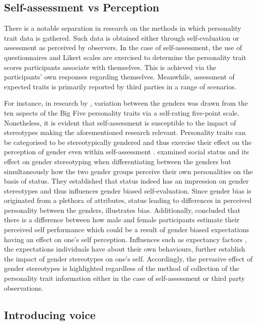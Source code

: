 \documentclass{l4proj}
\begin{document}
\subsection{Self-assessment vs Perception}\label{sec:self_vs_perception}
There is a notable separation in research on the methods in which personality trait data is gathered. Such data is obtained either through self-evaluation or assessment as perceived by observers. In the case of self-assessment, the use of questionnaires and Likert scales are exercised to determine the personality trait scores participants associate with themselves. This is achieved via the participants' own responses regarding themselves. Meanwhile, assessment of expected traits is primarily reported by third parties in a range of scenarios. 

For instance, in research by \citet{Weisberg2011}, variation between the genders was drawn from the ten aspects of the Big Five personality traits via a self-rating five-point scale. Nonetheless, it is evident that self-assessment is susceptible to the impact of stereotypes making the aforementioned research relevant. Personality traits can be categorised to be stereotypically gendered and thus exercise their effect on the perception of gender even within self-assessment \citep{Gerber2009,Ellemers2017}. 
\citet{Gerber2009} examined social status and its effect on gender stereotyping when differentiating between the genders but simultaneously how the two gender groups perceive their own personalities on the basis of status. They established that status indeed has an impression on gender stereotypes and thus influences gender biased self-evaluation. Since gender bias is originated from a plethora of attributes, status leading to differences in perceived personality between the genders, illustrates bias.
Additionally, \citet{beyer1990gender} concluded that there is a difference between how male and female participants estimate their perceived self performance which could be a result of gender biased expectations having an effect on one's self perception.
Influences such as expectancy factors \citep{Newman1990}, the expectations individuals have about their own behaviours, further establish the impact of gender stereotypes on one’s self.
Accordingly, the pervasive effect of gender stereotypes is highlighted regardless of the method of collection of the personality trait information either in the case of self-assessment or third party observations.

\subsection{Introducing voice}\label{sec:Introducing_voice}
\end{document}
